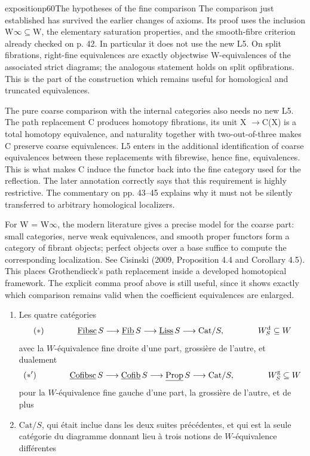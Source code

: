 \begin{dcomment}{exposition}{p60}{The hypotheses of the fine comparison}
The comparison just established has survived the earlier changes of axioms. Its proof uses the inclusion W\ensuremath{\infty}\ensuremath{\subseteq}W, the elementary saturation properties, and the smooth-fibre criterion already checked on p. 42. In particular it does not use the new L5. On split fibrations, right-fine equivalences are exactly objectwise W-equivalences of the associated strict diagrams; the analogous statement holds on split opfibrations. This is the part of the construction which remains useful for homological and truncated equivalences.

The pure coarse comparison with the internal categories also needs no new L5. The path replacement C produces homotopy fibrations, its unit X \ensuremath{\to}C(X) is a total homotopy equivalence, and naturality together with two-out-of-three makes C preserve coarse equivalences. L5 enters in the additional identification of coarse equivalences between these replacements with fibrewise, hence fine, equivalences. This is what makes C induce the functor back into the fine category used for the reflection. The later annotation correctly says that this requirement is highly restrictive. The commentary on pp. 43--45 explains why it must not be silently transferred to arbitrary homological localizers.

For W = W\ensuremath{\infty}, the modern literature gives a precise model for the coarse part: small categories, nerve weak equivalences, and smooth proper functors form a category of fibrant objects; perfect objects over a base suffice to compute the corresponding localization. See Cisinski (2009, Proposition 4.4 and Corollary 4.5). This places Grothendieck’s path replacement inside a developed homotopical framework. The explicit comma proof above is still useful, since it shows exactly which comparison remains valid when the coefficient equivalences are enlarged.

\end{dcomment}


\begin{enumerate}[label={}]
\item[$1^{o}$)] Les quatre catégories
\[(*) \qquad\qquad \underline{\mathrm{Fibsc}}\,S \longrightarrow \underline{\mathrm{Fib}}\,S \longrightarrow \underline{\mathrm{Liss}}\,S \longrightarrow \mathrm{Cat}/S, \qquad\qquad W_S^{\mathrm{d}} \subseteq W\]
avec la $W$-équivalence fine droite d'une part, grossière de l'autre, et dualement
\[(*') \qquad\qquad \underline{\mathrm{Cofibsc}}\,S \longrightarrow \underline{\mathrm{Cofib}}\,S \longrightarrow \underline{\mathrm{Prop}}\,S \longrightarrow \mathrm{Cat}/S, \qquad\qquad W_S^{\mathrm{g}} \subseteq W\]
pour la $W$-équivalence fine gauche d'une part, la grossière de l'autre, et de plus
\item[$2^{o}$)] $\mathrm{Cat}/S$, qui était inclue dans les deux suites précédentes, et qui est la seule catégorie du diagramme donnant lieu à trois notions de $W$-équivalence différentes %
\end{enumerate}

